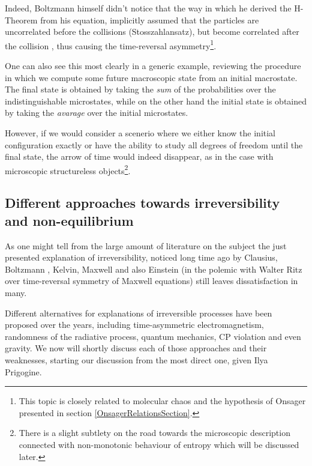 \documentclass[a4paper,12pt]{article}
\begin{document}
Indeed, Boltzmann himself didn't notice that the way in which he derived the H-Theorem from his equation, implicitly assumed that the particles are uncorrelated before the collisions (Stosszahlansatz), but become correlated after the collision \cite{Schwabl:2002, Dorfman:ozm67-zD}, thus causing the time-reversal asymmetry\footnote{This topic is closely related to molecular chaos and the hypothesis of Onsager presented in section \ref{OnsagerRelationsSection}.}.

One can also see this most clearly in a generic example, reviewing the procedure in which we compute some future macroscopic state from an initial macrostate. The final state is obtained by taking the \textit{sum} of the probabilities over the indistinguishable microstates, while on the other hand the initial state is obtained by taking the \textit{avarage} over the initial microstates.

However, if we would consider a scenerio where we either know the initial configuration exactly or have the ability to study all degrees of freedom until the final state, the arrow of time would indeed disappear, as in the case with microscopic structureless objects\footnote{There is a slight subtlety on the road towards the microscopic description connected with non-monotonic behaviour of entropy which will be discussed later.}.

\subsection{Different approaches towards irreversibility and non-equilibrium}

As one might tell from the large amount of literature on the subject \cite{Doyle:wf, Layzer:1970dx, Wolfram:552851, Rovelli:2015tv, Courbage:1983eo} %
the just presented explanation of irreversibility, noticed long time ago by Clausius, Boltzmann \cite{Wolfram:552851}, Kelvin, Maxwell \cite{Anonymous:0uVSJOI5} and also Einstein (in the polemic with Walter Ritz over time-reversal symmetry of Maxwell equations) still leaves dissatisfaction in many.

Different alternatives for explanations of irreversible processes have been proposed over the years, including time-asymmetric electromagnetism, randomness of the radiative process, quantum mechanics, CP violation and even gravity. We now will shortly discuss each of those approaches and their weaknesses, starting our discussion from the most direct one, given Ilya Prigogine.
\end{document}
